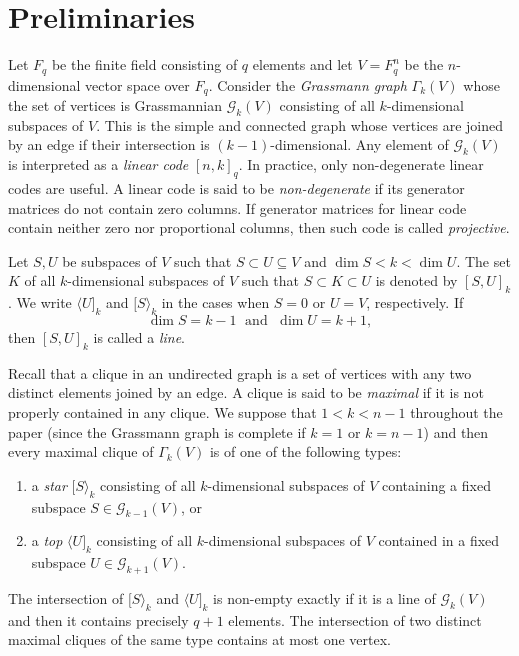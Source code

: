 \documentclass[12pt]{article}
\theoremstyle{definition}
\begin{document}
\section{Preliminaries}
Let $F_q$ be the finite field consisting of $q$ elements  and let  $V=F_{q}^{n}$ be the  $n$-dimensional vector space  over $F_q$. Consider  the {\it Grassmann graph} $\Gamma_{k}(V)$ whose the set of vertices is Grassmannian  ${\mathcal G}_{k}(V)$ consisting of all  $k$-dimensional subspaces of $V$.
This is the simple and connected graph whose  vertices are joined by an edge if their intersection is $(k-1)$-dimensional.
Any element of ${\mathcal G}_{k}(V)$ is interpreted as a {\it linear code} $[n,k]_{q}$.  In practice, only non-degenerate linear codes are useful. A linear code is said to be  {\it non-degenerate} if
its generator matrices do not contain zero columns.  If
 generator matrices for linear code contain neither zero nor proportional columns, then such code is called  {\it projective}.

Let $S, U$ be subspaces of $V$ such that $S\subset U\subseteq V$ and $\dim S<k<\dim U$. The set $K$ of all $k$-dimensional subspaces  of $V$ such that $S\subset K\subset U$ is denoted by $[S,U]_{k}$. We write  $\langle U]_{k}$ and $[S\rangle_{k}$ in the  cases when $S=0$ or $U=V$, respectively. If $$\dim S=k-1\;\mbox{ and }\;\dim U=k+1,$$ then $[S,U]_{k}$ is called a {\it line}.

Recall that a clique in
an undirected graph is a  set of  vertices with any two distinct
elements  joined by an edge. %
 A clique  is said to be {\it maximal} if it is not
properly contained in any clique.
We suppose  that $1<k<n-1$  throughout the paper (since the Grassmann graph is complete if $k=1$ or $k=n-1$) and then every  maximal clique of $\Gamma_{k}(V)$ is of one of the following types:\begin{enumerate}
\item[$\bullet$]
a {\it star}  $[S\rangle_{k}$ consisting of all $k$-dimensional subspaces of $V$ containing a fixed subspace $S\in {\mathcal G}_{k-1}(V)$,
or
\item[$\bullet$] a {\it top}  $\langle U]_{k}$ consisting of all $k$-dimensional subspaces of $V$ contained in a fixed  subspace $U\in {\mathcal G}_{k+1}(V)$.\end{enumerate}
The intersection of $[S\rangle_{k}$ and $\langle U]_{k}$  is non-empty exactly if
it is a line of ${\mathcal G}_k(V)$ and then it contains precisely $q+1$ elements. The intersection of two distinct maximal cliques of the  same type  contains at most one vertex.
\end{document}

